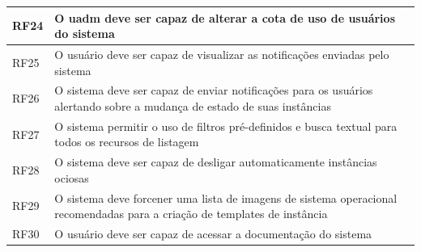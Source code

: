 \begin{longtable}{@{\extracolsep{\fill}}l p{}}
RF24 & O \gls{uadm} deve ser capaz de alterar a cota de uso de usuários do sistema \\ \hline

RF25 & O usuário deve ser capaz de visualizar as notificações enviadas pelo sistema \\ \hline

RF26 & O sistema deve ser capaz de enviar notificações para os usuários alertando sobre a mudança de estado de suas instâncias \\ \hline

RF27 & O sistema permitir o uso de filtros pré-definidos e busca textual para todos os recursos de listagem \\ 

RF28 & O sistema deve ser capaz de desligar automaticamente instâncias ociosas \\ \hline

RF29 & O sistema deve forcener uma lista de imagens de sistema operacional recomendadas para a criação de templates de instância \\ \hline

RF30 & O usuário deve ser capaz de acessar a documentação do sistema \\ \hline

\end{longtable}

